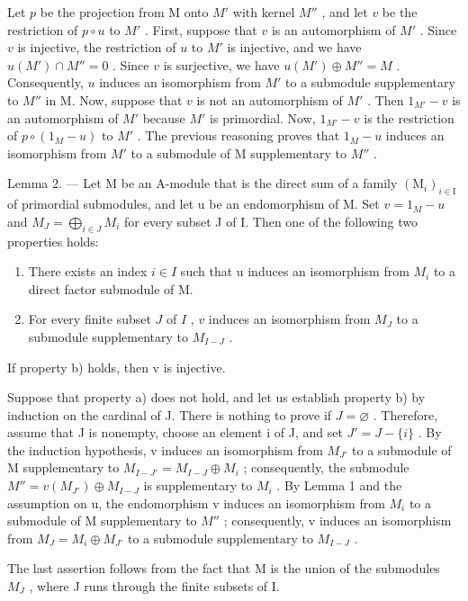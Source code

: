 Let \(p\) be the projection from M onto \(M'\) with kernel \(M''\) , and let \(v\) be the restriction of \(p \circ u\) to \(M'\) . First, suppose that \(v\) is an automorphism of \(M'\) . Since \(v\) is injective, the restriction of \(u\) to \(M'\) is injective, and we have \(u(M') \cap M'' = 0\) . Since \(v\) is surjective, we have \(u(M') \oplus M'' = M\) . Consequently, \(u\) induces an isomorphism from \(M'\) to a submodule supplementary to \(M''\) in M. Now, suppose that \(v\) is not an automorphism of \(M'\) . Then \(1_{M'} - v\) is an automorphism of \(M'\) because \(M'\) is primordial. Now, \(1_{M'} - v\) is the restriction of \(p \circ (1_M - u)\) to \(M'\) . The previous reasoning proves that \(1_M - u\) induces an isomorphism from \(M'\) to a submodule of M supplementary to \(M''\) .

Lemma 2. --- Let M be an A-module that is the direct sum of a family \((\mathrm{M}_{i})_{i\in\mathrm{I}}\) of primordial submodules, and let u be an endomorphism of M. Set \(v=1_{M}-u\) and \(M_{J}=\bigoplus_{i\in J}M_{i}\) for every subset J of I. Then one of the following two properties holds:

\begin{enumerate}
\def\labelenumi{\alph{enumi})}
\item
  There exists an index \(i \in I\) such that u induces an isomorphism from \(M_{i}\) to a direct factor submodule of M.
\item
  For every finite subset \(J\) of \(I\) , \(v\) induces an isomorphism from \(M_J\) to a submodule supplementary to \(M_{I-J}\) .
\end{enumerate}

If property b) holds, then v is injective.

Suppose that property a) does not hold, and let us establish property b) by induction on the cardinal of J. There is nothing to prove if \(J = \varnothing\) . Therefore, assume that J is nonempty, choose an element i of J, and set \(J' = J - \{i\}\) . By the induction hypothesis, v induces an isomorphism from \(M_{J'}\) to a submodule of M supplementary to \(M_{I-J'} = M_{I-J} \oplus M_i\) ; consequently, the submodule \(M'' = v(M_{J'}) \oplus M_{I-J}\) is supplementary to \(M_i\) . By Lemma 1 and the assumption on u, the endomorphism v induces an isomorphism from \(M_i\) to a submodule of M supplementary to \(M''\) ; consequently, v induces an isomorphism from \(M_J = M_i \oplus M_{J'}\) to a submodule supplementary to \(M_{I-J}\) .

The last assertion follows from the fact that M is the union of the submodules \(M_{J}\) , where J runs through the finite subsets of I.

